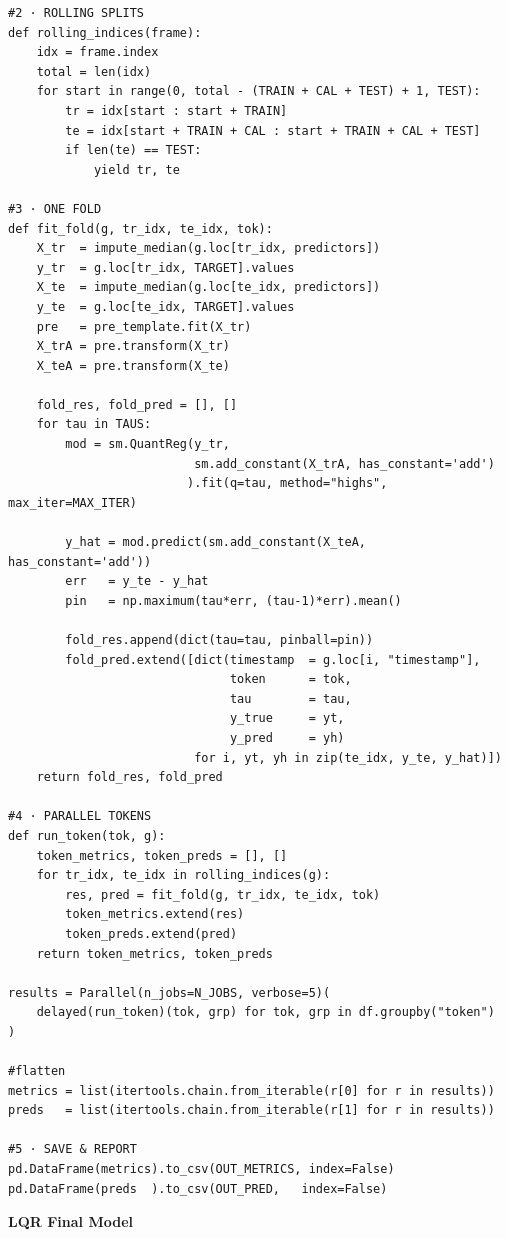 \documentclass[
  a4paper,
  DIV=11,
  numbers=noendperiod]{scrreprt}
\begin{document}
\begin{verbatim}
#2 · ROLLING SPLITS 
def rolling_indices(frame):
    idx = frame.index
    total = len(idx)
    for start in range(0, total - (TRAIN + CAL + TEST) + 1, TEST):
        tr = idx[start : start + TRAIN]
        te = idx[start + TRAIN + CAL : start + TRAIN + CAL + TEST]
        if len(te) == TEST:
            yield tr, te

#3 · ONE FOLD
def fit_fold(g, tr_idx, te_idx, tok):
    X_tr  = impute_median(g.loc[tr_idx, predictors])
    y_tr  = g.loc[tr_idx, TARGET].values
    X_te  = impute_median(g.loc[te_idx, predictors])
    y_te  = g.loc[te_idx, TARGET].values
    pre   = pre_template.fit(X_tr)
    X_trA = pre.transform(X_tr)
    X_teA = pre.transform(X_te)

    fold_res, fold_pred = [], []
    for tau in TAUS:
        mod = sm.QuantReg(y_tr,
                          sm.add_constant(X_trA, has_constant='add')
                         ).fit(q=tau, method="highs", max_iter=MAX_ITER)

        y_hat = mod.predict(sm.add_constant(X_teA, has_constant='add'))
        err   = y_te - y_hat
        pin   = np.maximum(tau*err, (tau-1)*err).mean()

        fold_res.append(dict(tau=tau, pinball=pin))
        fold_pred.extend([dict(timestamp  = g.loc[i, "timestamp"],
                               token      = tok,
                               tau        = tau,
                               y_true     = yt,
                               y_pred     = yh)
                          for i, yt, yh in zip(te_idx, y_te, y_hat)])
    return fold_res, fold_pred

#4 · PARALLEL TOKENS
def run_token(tok, g):
    token_metrics, token_preds = [], []
    for tr_idx, te_idx in rolling_indices(g):
        res, pred = fit_fold(g, tr_idx, te_idx, tok)
        token_metrics.extend(res)
        token_preds.extend(pred)
    return token_metrics, token_preds

results = Parallel(n_jobs=N_JOBS, verbose=5)(
    delayed(run_token)(tok, grp) for tok, grp in df.groupby("token")
)

#flatten
metrics = list(itertools.chain.from_iterable(r[0] for r in results))
preds   = list(itertools.chain.from_iterable(r[1] for r in results))

#5 · SAVE & REPORT 
pd.DataFrame(metrics).to_csv(OUT_METRICS, index=False)
pd.DataFrame(preds  ).to_csv(OUT_PRED,   index=False)
\end{verbatim}

\textbf{LQR Final Model}
\end{document}
